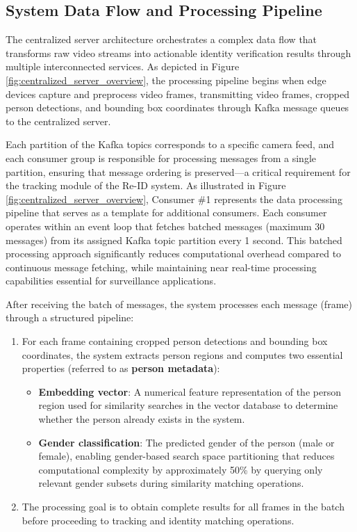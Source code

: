 \subsection{System Data Flow and Processing Pipeline}

The centralized server architecture orchestrates a complex data flow that transforms raw video streams into actionable identity verification results through multiple interconnected services. As depicted in Figure \ref{fig:centralized_server_overview}, the processing pipeline begins when edge devices capture and preprocess video frames, transmitting video frames, cropped person detections, and bounding box coordinates through Kafka message queues to the centralized server.

Each partition of the Kafka topics corresponds to a specific camera feed, and each consumer group is responsible for processing messages from a single partition, ensuring that message ordering is preserved—a critical requirement for the tracking module of the Re-ID system. As illustrated in Figure \ref{fig:centralized_server_overview}, Consumer \#1 represents the data processing pipeline that serves as a template for additional consumers. Each consumer operates within an event loop that fetches batched messages (maximum 30 messages) from its assigned Kafka topic partition every 1 second. This batched processing approach significantly reduces computational overhead compared to continuous message fetching, while maintaining near real-time processing capabilities essential for surveillance applications.

After receiving the batch of messages, the system processes each message (frame) through a structured pipeline:

\begin{enumerate}
   \item For each frame containing cropped person detections and bounding box coordinates, the system extracts person regions and computes two essential properties (referred to as \textbf{person metadata}):
   \begin{itemize}
       \item \textbf{Embedding vector}: A numerical feature representation of the person region used for similarity searches in the vector database to determine whether the person already exists in the system.
       \item \textbf{Gender classification}: The predicted gender of the person (male or female), enabling gender-based search space partitioning that reduces computational complexity by approximately 50\% by querying only relevant gender subsets during similarity matching operations.
   \end{itemize}
   \item The processing goal is to obtain complete results for all frames in the batch before proceeding to tracking and identity matching operations.
\end{enumerate}

